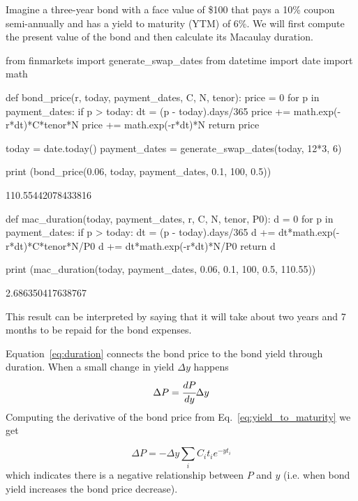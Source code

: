 Imagine a three-year bond with a face value of \$100 that pays a 10\% coupon semi-annually and has a yield to maturity (YTM) of 6\%. We will first compute the present value of the bond and then calculate its Macaulay duration.

\begin{ipython}
from finmarkets import generate_swap_dates
from datetime import date
import math 

def bond_price(r, today, payment_dates, C, N, tenor):
    price = 0
    for p in payment_dates:
        if p > today:
            dt = (p - today).days/365
            price += math.exp(-r*dt)*C*tenor*N
    price += math.exp(-r*dt)*N
    return price

today = date.today()
payment_dates = generate_swap_dates(today, 12*3, 6)

print (bond_price(0.06, today, payment_dates, 0.1, 100, 0.5))
\end{ipython}
\begin{ioutput}
110.55442078433816
\end{ioutput}

\begin{ipython}
def mac_duration(today, payment_dates, r, C, N, tenor, P0):
    d = 0
    for p in payment_dates:
        if p > today:
            dt = (p - today).days/365
            d += dt*math.exp(-r*dt)*C*tenor*N/P0
    d += dt*math.exp(-r*dt)*N/P0
    return d

print (mac_duration(today, payment_dates, 0.06, 0.1, 100, 0.5, 110.55))
\end{ipython}
\begin{ioutput}
2.686350417638767
\end{ioutput}

This result can be interpreted by saying that it will take about two years and 7 months to be repaid for the bond expenses.

Equation~\ref{eq:duration} connects the bond price to the bond yield through duration. When a small change in yield $\Delta y$ happens
\begin{equation}
\Delta P = \cfrac{dP}{dy}\Delta y
\label{eq:price_1st_order}
\end{equation}
\noindent
Computing the derivative of the bond price from Eq.~\ref{eq:yield_to_maturity} we get

\begin{equation}
\Delta P = -\Delta y\sum_i C_i t_i e^{-yt_i}
\label{eq:price_yield}
\end{equation}
\noindent
which indicates there is a negative relationship between $P$ and $y$ (i.e. when bond yield increases the bond price decrease). 

